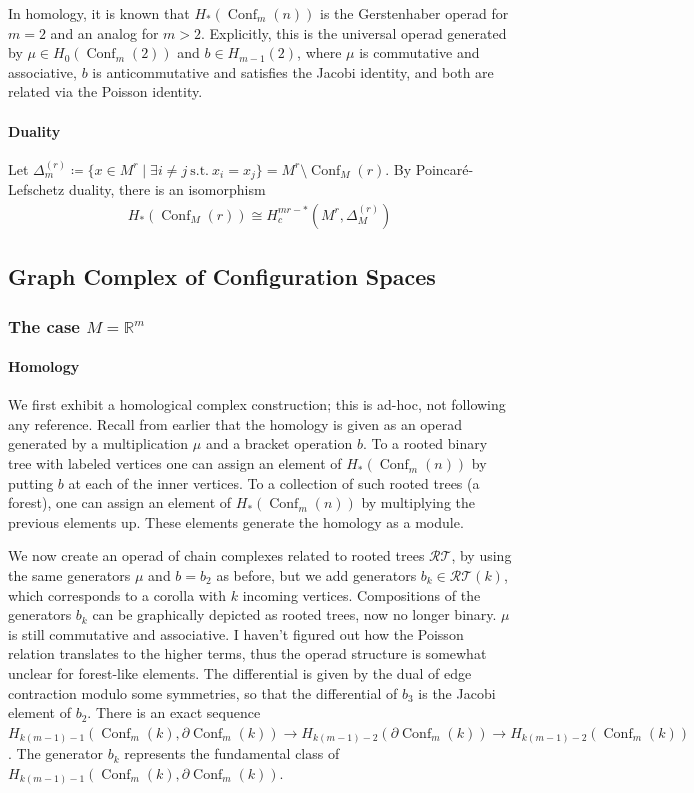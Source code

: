 \documentclass{scrartcl}
\theoremstyle{plain}
\theoremstyle{definition}
\newcommand{\R}{\mathbb R}
\newcommand{\iso}{\cong}
\newcommand{\defeq}{\coloneqq}
\DeclareMathOperator{\Conf}{Conf}
\begin{document}
In homology, it is known that $H_*(\Conf_m(n))$ is the Gerstenhaber operad for $m=2$ and an analog for $m>2$. Explicitly, this is the universal operad generated by $\mu\in H_0(\Conf_m(2))$ and $b\in H_{m-1}(2)$, where $\mu$ is commutative and associative, $b$ is anticommutative and satisfies the Jacobi identity, and both are related via the Poisson identity. 

\paragraph{Duality}
Let $\Delta_m^{(r)} \defeq \{x\in M^r \mid \exists i\neq j \ \text{s.t.}\ x_i = x_j\} = M^r\setminus \Conf_M(r)$. By Poincaré-Lefschetz duality, there is an isomorphism 
\begin{align*}
    H_*(\Conf_M(r)) \iso H_c^{mr- *}(M^r, \Delta^{(r)}_M)
\end{align*}




\subsection{Graph Complex of Configuration Spaces}

\subsubsection[The euclidean case]{The case $M=\R^m$}

\paragraph{Homology} We first exhibit a homological complex construction; this is ad-hoc, not following any reference. Recall from earlier that the homology is given as an operad generated by a multiplication $\mu$ and a bracket operation $b$. To a rooted binary tree with labeled vertices one can assign an element of $H_*(\Conf_m(n))$ by putting $b$ at each of the inner vertices. To a collection of such rooted trees (a forest), one can assign an element of $H_*(\Conf_m(n))$ by multiplying the previous elements up. These elements generate the homology as a module. 

We now create an operad of chain complexes related to rooted trees $\mathcal{RT}$, by using the same generators $\mu$ and $b=b_2$ as before, but we add generators $b_k\in\mathcal{RT}(k)$, which corresponds to a corolla with $k$ incoming vertices. Compositions of the generators $b_k$ can be graphically depicted as rooted trees, now no longer binary. $\mu$ is still commutative and associative. I haven't figured out how the Poisson relation translates to the higher terms, thus the operad structure is somewhat unclear for forest-like elements. The differential is given by the dual of edge contraction modulo some symmetries, so that the differential of $b_3$ is the Jacobi element of $b_2$. There is an exact sequence $H_{k(m-1)-1}(\Conf_m(k), \partial\Conf_m(k)) \to H_{k(m-1)-2}(\partial\Conf_m(k)) \to H_{k(m-1)-2}(\Conf_m(k))$. The generator $b_k$ represents the fundamental class of $H_{k(m-1)-1}(\Conf_m(k), \partial\Conf_m(k))$.
\end{document}
